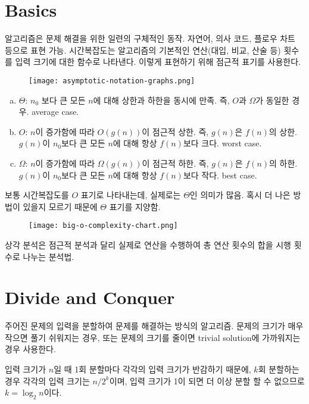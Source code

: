 \section{Basics}

알고리즘은 문제 해결을 위한 일련의 구체적인 동작. 자연어, 의사 코드, 플로우 차트 등으로 표현 가능. 시간복잡도는 알고리즘의 기본적인 연산(대입, 비교, 산술 등) 횟수를 입력 크기에 대한 함수로 나타낸다. 이렇게 표현하기 위해 점근적 표기를 사용한다.

\begin{figure}[h]
  \centering
  \texttt{[image: asymptotic-notation-graphs.png]}
\end{figure}

\begin{enumerate}[(a)]
  \item $\Theta$: $n_0$ 보다 큰 모든 $n$에 대해 상한과 하한을 동시에 만족. 즉, $O$과 $\Omega$가 동일한 경우. average case.
  \item $O$: $n$이 증가함에 따라 $O(g(n))$이 점근적 상한. 즉, $g(n)$은 $f(n)$의 상한. $g(n)$이 $n_0$보다 큰 모든 $n$에 대해 항상 $f(n)$보다 크다. worst case.
  \item $\Omega$: $n$이 증가함에 따라 $\Omega(g(n))$이 점근적 하한. 즉, $g(n)$은 $f(n)$의 하한. $g(n)$이 $n_0$보다 큰 모든 $n$에 대해 항상 $f(n)$보다 작다. best case.
\end{enumerate}

보통 시간복잡도를 $O$ 표기로 나타내는데, 실제로는 $\Theta$인 의미가 많음. 혹시 더 나은 방법이 있을지 모르기 때문에 $\Theta$ 표기를 지양함.

\begin{figure}[h]
  \centering
  \texttt{[image: big-o-complexity-chart.png]}
\end{figure}

상각 분석은 점근적 분석과 달리 실제로 연산을 수행하여 총 연산 횟수의 합을 시행 횟수로 나누는 분석법.

\section{Divide and Conquer}

주어진 문제의 입력을 분할하여 문제를 해결하는 방식의 알고리즘. 문제의 크기가 매우 작으면 풀기 쉬워지는 경우, 또는 문제의 크기를 줄이면 trivial solution에 가까워지는 경우 사용한다.

입력 크기가 $n$일 때 1회 분할마다 각각의 입력 크기가 반감하기 때문에, $k$회 분할하는 경우 각각의 입력 크기는 $n / 2^k$이며, 입력 크기가 1이 되면 더 이상 분할 할 수 없으므로 $k = \log_2{n}$이다.

